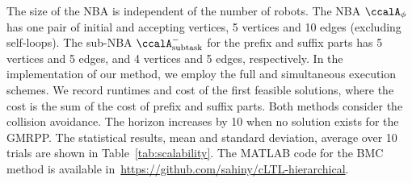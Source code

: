 \documentclass[Afour,sageh,times]{sagej}
\newcommand{\auto}[1]{\ccalA_{\textup{#1}}}
\newcommand{\autop}{\ccalA_{\phi}}
\begin{document}
{{The size of the NBA is independent of the number of robots. The NBA $\autop$ has one pair of initial and accepting vertices, 5 vertices and 10 edges (excluding self-loops). The sub-NBA $\auto{subtask}^-$ for the prefix and suffix  parts has 5 vertices and 5 edges, and 4 vertices and 5 edges, respectively. In the implementation of our method, we employ the full and simultaneous execution schemes. We record runtimes  and cost of the first feasible solutions, where the cost is the sum of the cost of prefix and suffix parts. %
Both methods consider the collision avoidance. The horizon increases by 10 when no solution exists for the GMRPP.
The statistical results, mean and standard deviation, average over 10 trials are shown in Table~\ref{tab:scalability}. The MATLAB code for the BMC method is available in~\url{https://github.com/sahiny/cLTL-hierarchical}.
\begin{table}[!t]
  \caption{Results with respect to the number of robots}\label{tab:scalability}
  \centering
\end{table}

}}
\end{document}
